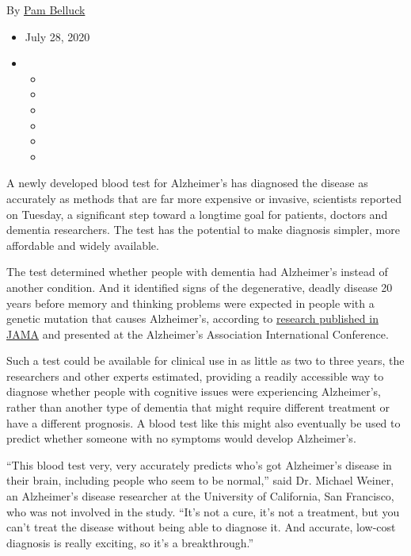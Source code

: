By \href{https://www.nytimes3xbfgragh.onion/by/pam-belluck}{Pam Belluck}

\begin{itemize}
\item
  July 28, 2020
\item
  \begin{itemize}
  \item
  \item
  \item
  \item
  \item
  \item
  \end{itemize}
\end{itemize}

A newly developed blood test for Alzheimer's has diagnosed the disease
as accurately as methods that are far more expensive or invasive,
scientists reported on Tuesday, a significant step toward a longtime
goal for patients, doctors and dementia researchers. The test has the
potential to make diagnosis simpler, more affordable and widely
available.

The test determined whether people with dementia had Alzheimer's instead
of another condition. And it identified signs of the degenerative,
deadly disease 20 years before memory and thinking problems were
expected in people with a genetic mutation that causes Alzheimer's,
according to
\href{https://jamanetwork.com/journals/jama/fullarticle/10.1001/jama.2020.12134?guestAccessKey=42d098cb-7eca-4a1c-9d7b-9951b104b003\&utm_source=For_The_Media\&utm_medium=referral\&utm_campaign=ftm_links\&utm_content=tfl\&utm_term=072820}{research
published in JAMA} and presented at the Alzheimer's Association
International Conference.

Such a test could be available for clinical use in as little as two to
three years, the researchers and other experts estimated, providing a
readily accessible way to diagnose whether people with cognitive issues
were experiencing Alzheimer's, rather than another type of dementia that
might require different treatment or have a different prognosis. A blood
test like this might also eventually be used to predict whether someone
with no symptoms would develop Alzheimer's.

``This blood test very, very accurately predicts who's got Alzheimer's
disease in their brain, including people who seem to be normal,'' said
Dr. Michael Weiner, an Alzheimer's disease researcher at the University
of California, San Francisco, who was not involved in the study. ``It's
not a cure, it's not a treatment, but you can't treat the disease
without being able to diagnose it. And accurate, low-cost diagnosis is
really exciting, so it's a breakthrough.''

